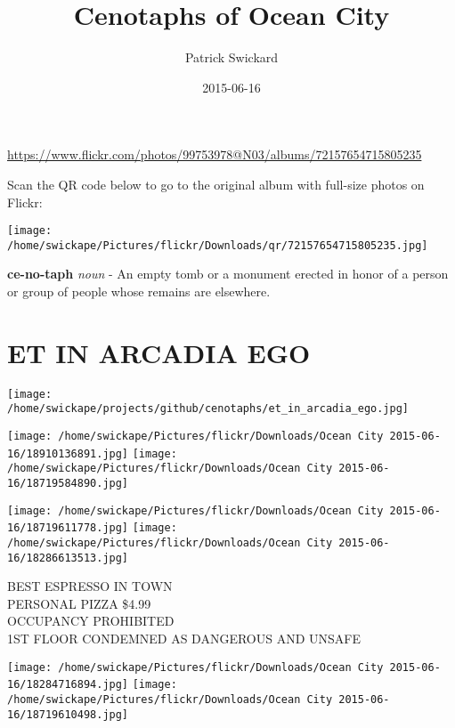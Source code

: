 \documentclass[10pt,letterpaper]{article}
\title{Cenotaphs of Ocean City}
\author{Patrick Swickard}
\date{2015-06-16}
\begin{document}
\maketitle

\url{https://www.flickr.com/photos/99753978@N03/albums/72157654715805235}

Scan the QR code below to go to the original album with full-size photos on Flickr:

\texttt{[image: /home/swickape/Pictures/flickr/Downloads/qr/72157654715805235.jpg]}
\pagebreak

\newpage\null\thispagestyle{empty}\newpage

\pagebreak

\vspace*{4in}
\textbf{ce-no-taph} \textit{noun} - An empty tomb or a monument erected in honor of a person or group of people whose remains are elsewhere.

\newpage\null\thispagestyle{empty}\newpage

\pagebreak

\vspace*{2in}
\section*{ET IN ARCADIA EGO}
\vspace*{1in}
\texttt{[image: /home/swickape/projects/github/cenotaphs/et\_in\_arcadia\_ego.jpg]}


\pagebreak

\newpage\null\thispagestyle{empty}\newpage

\pagebreak
\texttt{[image: /home/swickape/Pictures/flickr/Downloads/Ocean City 2015-06-16/18910136891.jpg]}
\texttt{[image: /home/swickape/Pictures/flickr/Downloads/Ocean City 2015-06-16/18719584890.jpg]}

\texttt{[image: /home/swickape/Pictures/flickr/Downloads/Ocean City 2015-06-16/18719611778.jpg]}
\texttt{[image: /home/swickape/Pictures/flickr/Downloads/Ocean City 2015-06-16/18286613513.jpg]}

BEST ESPRESSO IN TOWN\\
PERSONAL PIZZA \$4.99\\
OCCUPANCY PROHIBITED\\
1ST FLOOR CONDEMNED AS DANGEROUS AND UNSAFE
\pagebreak

\texttt{[image: /home/swickape/Pictures/flickr/Downloads/Ocean City 2015-06-16/18284716894.jpg]}
\texttt{[image: /home/swickape/Pictures/flickr/Downloads/Ocean City 2015-06-16/18719610498.jpg]}
\end{document}
